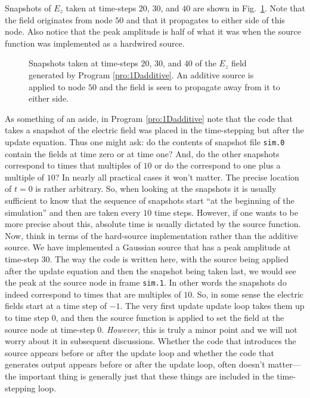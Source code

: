 Snapshots of $E_z$ taken at time-steps $20$, $30$, and $40$ are shown
in Fig.\ \ref{fig:additive}.  Note that the field originates from node
$50$ and that it propagates to either side of this node.  Also notice
that the peak amplitude is half of what it was when the source
function was implemented as a hardwired source.
\begin{figure}
  \begin{center}
  \end{center}
  \caption{Snapshots taken at time-steps $20$, $30$, and $40$ of the
    $E_z$ field generated by Program \ref{pro:1Dadditive}.  An
    additive source is applied to node $50$ and the field is seen to
    propagate away from it to either side.}
  \label{fig:additive} 
\end{figure}

As something of an aside, in Program \ref{pro:1Dadditive} note that
the code that takes a snapshot of the electric field was placed in the
time-stepping but after the update equation.  Thus one might ask: do
the contents of snapshot file {\tt sim.0} contain the fields at time
zero or at time one?  And, do the other snapshots correspond to times
that multiples of $10$ or do the correspond to one plus a multiple of
$10$?  In nearly all practical cases it won't matter.  The precise
location of $t=0$ is rather arbitrary.  So, when looking at the
snapshots it is usually sufficient to know that the sequence of
snapshots start ``at the beginning of the simulation'' and then are
taken every $10$ time steps.  However, if one wants to be more precise
about this, absolute time is usually dictated by the source function.
Now, think in terms of the hard-source implementation rather than the
additive source.  We have implemented a Gaussian source that has a
peak amplitude at time-step $30$.  The way the code is written here,
with the source being applied after the update equation and then the
snapshot being taken last, we would see the peak at the source node in
frame {\tt sim.1}.  In other words the snapshots do indeed correspond
to times that are multiples of $10$.  So, in some sense the electric
fields start at a time step of $-1$.  The very first update update
loop takes them up to time step $0$, and then the source function is
applied to set the field at the source node at time-step $0$.  {\em
  However}, this is truly a minor point and we will not worry about it
in subsequent discussions.  Whether the code that introduces the
source appears before or after the update loop and whether the code
that generates output appears before or after the update loop, often
doesn't matter---the important thing is generally just that these
things are included in the time-stepping loop.

